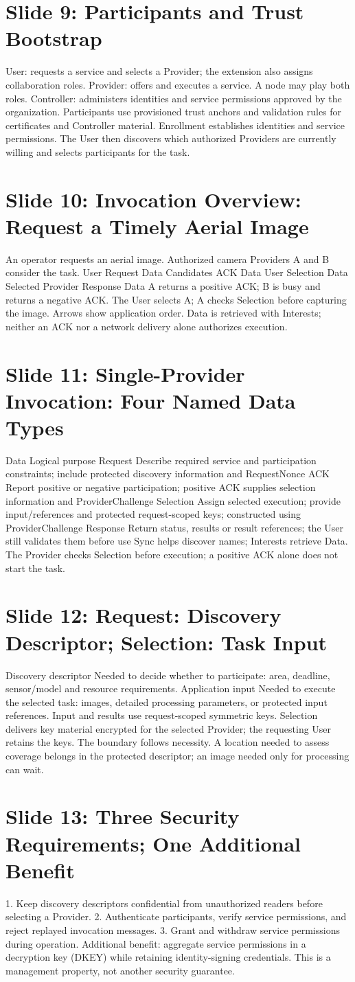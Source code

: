 \documentclass[11pt]{article}
\newcommand{\slideentry}[3]{\section*{Slide #1: #2}#3\par}
\begin{document}
\slideentry{9}{Participants and Trust Bootstrap}{
User: requests a service and selects a Provider; the extension also assigns collaboration roles. Provider: offers and executes a service. A node may play both roles. Controller: administers identities and service permissions approved by the organization. Participants use provisioned trust anchors and validation rules for certificates and Controller material. Enrollment establishes identities and service permissions. The User then discovers which authorized Providers are currently willing and selects participants for the task.
}
\slideentry{10}{Invocation Overview: Request a Timely Aerial Image}{
An operator requests an aerial image. Authorized camera Providers A and B consider the task. User Request Data Candidates ACK Data User Selection Data Selected Provider Response Data A returns a positive ACK; B is busy and returns a negative ACK. The User selects A; A checks Selection before capturing the image. Arrows show application order. Data is retrieved with Interests; neither an ACK nor a network delivery alone authorizes execution.
}
\slideentry{11}{Single-Provider Invocation: Four Named Data Types}{
Data Logical purpose Request Describe required service and participation constraints; include protected discovery information and RequestNonce ACK Report positive or negative participation; positive ACK supplies selection information and ProviderChallenge Selection Assign selected execution; provide input/references and protected request-scoped keys; constructed using ProviderChallenge Response Return status, results or result references; the User still validates them before use Sync helps discover names; Interests retrieve Data. The Provider checks Selection before execution; a positive ACK alone does not start the task.
}
\slideentry{12}{Request: Discovery Descriptor; Selection: Task Input}{
Discovery descriptor Needed to decide whether to participate: area, deadline, sensor/model and resource requirements. Application input Needed to execute the selected task: images, detailed processing parameters, or protected input references. Input and results use request-scoped symmetric keys. Selection delivers key material encrypted for the selected Provider; the requesting User retains the keys. The boundary follows necessity. A location needed to assess coverage belongs in the protected descriptor; an image needed only for processing can wait.
}
\slideentry{13}{Three Security Requirements; One Additional Benefit}{
1. Keep discovery descriptors confidential from unauthorized readers before selecting a Provider. 2. Authenticate participants, verify service permissions, and reject replayed invocation messages. 3. Grant and withdraw service permissions during operation. Additional benefit: aggregate service permissions in a decryption key (DKEY) while retaining identity-signing credentials. This is a management property, not another security guarantee.
}
\end{document}
